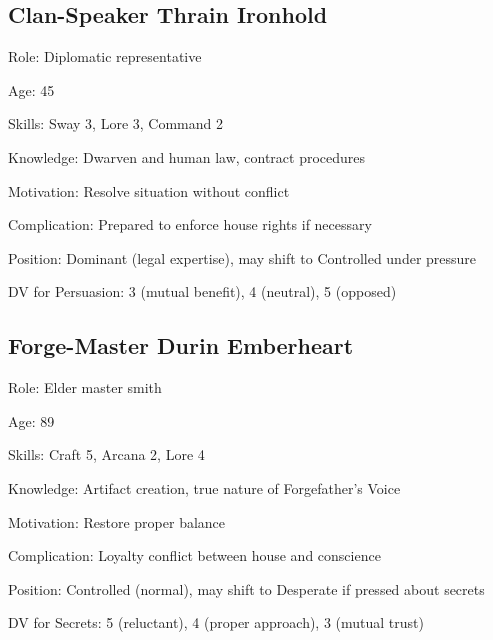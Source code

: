 \documentclass[11pt]{article}
\newenvironment{npc}[1]{\begin{description}[leftmargin=*,style=standard]\item[\textbf{#1}]}{\end{description}}
\begin{document}
\subsection{Clan-Speaker Thrain Ironhold}
\begin{npc}{Clan-Speaker Thrain Ironhold}
\item[Role:] Diplomatic representative
\item[Age:] 45
\item[Skills:] Sway 3, Lore 3, Command 2
\item[Knowledge:] Dwarven and human law, contract procedures
\item[Motivation:] Resolve situation without conflict
\item[Complication:] Prepared to enforce house rights if necessary
\item[Position:] Dominant (legal expertise), may shift to Controlled under pressure
\item[DV for Persuasion:] 3 (mutual benefit), 4 (neutral), 5 (opposed)
\end{npc}

\subsection{Forge-Master Durin Emberheart}
\begin{npc}{Forge-Master Durin Emberheart}
\item[Role:] Elder master smith
\item[Age:] 89
\item[Skills:] Craft 5, Arcana 2, Lore 4
\item[Knowledge:] Artifact creation, true nature of Forgefather's Voice
\item[Motivation:] Restore proper balance
\item[Complication:] Loyalty conflict between house and conscience
\item[Position:] Controlled (normal), may shift to Desperate if pressed about secrets
\item[DV for Secrets:] 5 (reluctant), 4 (proper approach), 3 (mutual trust)
\end{npc}
\end{document}
